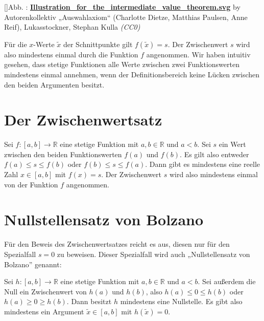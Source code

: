 \documentclass[fontsize=9pt,
               parskip=half-,
               DIV=14,
               listof=chapterentry,
               tocflat]{scrbook}
\newcounter{imagelabel}
\begin{document}
[]{Abb. : \protect\href{https://commons.wikimedia.org/wiki/File:Illustration_for_the_intermediate_value_theorem.svg}{\textbf{Illustration\allowbreak\_for\allowbreak\_the\allowbreak\_intermediate\allowbreak\_value\allowbreak\_theorem.svg}} by Autorenkollektiv „Auswahlaxiom“ (Charlotte Dietze, Matthias Paulsen, Anne Reif), Lukasstockner, Stephan Kulla \textit{(CC0)}}\begin{center}
\end{center}

Für die $x$-Werte ${\tilde {x}}$ der Schnittpunkte gilt $f({\tilde {x}})=s$. Der Zwischenwert $s$ wird also mindestens einmal durch die Funktion $f$ angenommen. Wir haben intuitiv gesehen, dass stetige Funktionen alle Werte zwischen zwei Funktionswerten mindestens einmal annehmen, wenn der Definitionsbereich keine Lücken zwischen den beiden Argumenten besitzt.

\section{Der Zwischenwertsatz}

\begin{theorem*}[Zwischenwertsatz]
Sei $f:[a,b]\to \mathbb {R} $ eine stetige Funktion mit $a,b\in \mathbb {R} $ und $a<b$. Sei $s$ ein Wert zwischen den beiden Funktionswerten $f(a)$ und $f(b)$. Es gilt also entweder $f(a)\leq s\leq f(b)$ oder $f(b)\leq s\leq f(a)$. Dann gibt es mindestens eine reelle Zahl $x\in [a,b]$ mit $f(x)=s$. Der Zwischenwert $s$ wird also mindestens einmal von der Funktion $f$ angenommen.

\end{theorem*}

\section{Nullstellensatz von Bolzano}

Für den Beweis des Zwischenwertsatzes reicht es aus, diesen nur für den Spezialfall $s=0$ zu beweisen. Dieser Spezialfall wird auch „Nullstellensatz von Bolzano” genannt:

\begin{theorem*}
Sei $h:[a,b]\to \mathbb {R} $ eine stetige Funktion mit $a,b\in \mathbb {R} $ und $a<b$. Sei außerdem die Null ein Zwischenwert von $h(a)$ und $h(b)$, also $h(a)\leq 0\leq h(b)$ oder $h(a)\geq 0\geq h(b)$. Dann besitzt $h$ mindestens eine Nullstelle. Es gibt also mindestens ein Argument ${\tilde {x}}\in [a,b]$ mit $h({\tilde {x}})=0$.

\end{theorem*}
\end{document}
